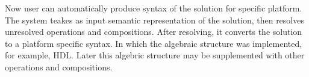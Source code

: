 Now user can automatically produce syntax of the solution for specific platform. The system teakes as input semantic representation of the solution, then resolves unresolved operations and compositions. After resolving, it converts the solution to a platform specific syntax. In which the algebraic structure was implemented, for example, HDL. Later this algebric structure may be supplemented with other operations and compositions.\\

